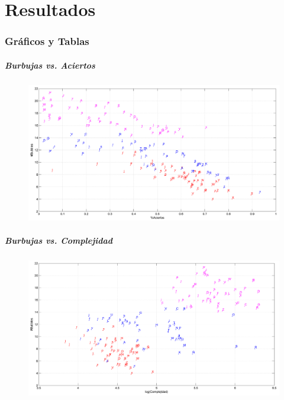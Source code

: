 \documentclass[10pt]{beamer}
\begin{document}

\part{Resultados}
  \frame{\partpage}
  \section{Gr\'aficos y Tablas}
 	\begin{frame}
	\frametitle{Burbujas vs. Aciertos}
	    \begin{figure}
		\includegraphics[width=\textwidth]{graficos/bubblesVsAciertos_Fiables.png}
	    \end{figure}
	\end{frame}

 	\begin{frame}
	\frametitle{Burbujas vs. Complejidad}
	    \begin{figure}
		\includegraphics[width=\textwidth]{graficos/bubblesVsLogComplejidad_Fiables.png}
	    \end{figure}
	\end{frame}
\end{document}
